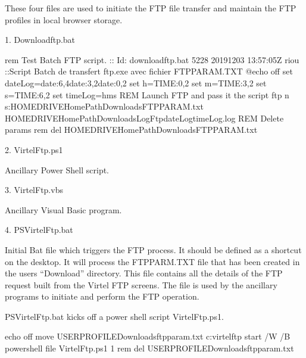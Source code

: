 \documentclass[letterpaper,10pt,english]{sphinxmanual}
\begin{document}
These four files are used to initiate the FTP file transfer and maintain the FTP profiles in local browser storage.

\begin{sphinxVerbatim}[commandchars=\\\{\}]
1.  Downloadftp.bat

    rem Test Batch FTP script.
    :: \PYGZdl{}Id: downloadftp.bat 5228 2019\PYGZhy{}12\PYGZhy{}03 13:57:05Z riou \PYGZdl{}
    ::Script Batch de transfert ftp.exe avec fichier FTPPARAM.TXT
    @echo off
    set dateLog=\PYGZpc{}date:\PYGZti{}6,4\PYGZpc{}\PYGZpc{}date:\PYGZti{}3,2\PYGZpc{}\PYGZpc{}date:\PYGZti{}0,2\PYGZpc{}
    set h=\PYGZpc{}TIME:\PYGZti{}0,2\PYGZpc{}
    set m=\PYGZpc{}TIME:\PYGZti{}3,2\PYGZpc{}
    set s=\PYGZpc{}TIME:\PYGZti{}6,2\PYGZpc{}
    set timeLog=\PYGZpc{}h\PYGZpc{}\PYGZus{}\PYGZpc{}m\PYGZpc{}\PYGZus{}\PYGZpc{}s\PYGZpc{}
    REM Launch FTP and pass it the  script
    ftp \PYGZhy{}n \PYGZhy{}s:\PYGZpc{}HOMEDRIVE\PYGZpc{}\PYGZpc{}HomePath\PYGZpc{}\PYGZbs{}Downloads\PYGZbs{}FTPPARAM.txt \PYGZgt{}\PYGZpc{}HOMEDRIVE\PYGZpc{}\PYGZpc{}HomePath\PYGZpc{}\PYGZbs{}Downloads\PYGZbs{}Log\PYGZus{}Ftp\PYGZus{}\PYGZpc{}dateLog\PYGZpc{}\PYGZus{}\PYGZpc{}timeLog\PYGZpc{}.log
    REM Delete params
    rem del \PYGZpc{}HOMEDRIVE\PYGZpc{}\PYGZpc{}HomePath\PYGZpc{}\PYGZbs{}Downloads\PYGZbs{}FTPPARAM.txt

2.  VirtelFtp.ps1

    Ancillary Power Shell script.

3.  VirtelFtp.vbs

    Ancillary Visual Basic program.

4.  PSVirtelFtp.bat

    Initial Bat file which triggers the FTP process. It should be defined as a short\PYGZhy{}cut on the desktop. It will process the FTPPARM.TXT file that has been created in the users “Download” directory. This file contains all the details of the FTP request built from the Virtel FTP screens. The file is used by the ancillary programs to initiate and perform the FTP operation.

    PSVirtelFtp.bat kicks off a power shell script VirtelFtp.ps1.

        echo off
        move \PYGZpc{}USERPROFILE\PYGZpc{}\PYGZbs{}Downloads\PYGZbs{}ftpparam.txt c:\PYGZbs{}virtel\PYGZbs{}ftp
        start /W /B powershell \PYGZhy{}file VirtelFtp.ps1 \PYGZpc{}1
        rem del \PYGZpc{}USERPROFILE\PYGZpc{}\PYGZbs{}Downloads\PYGZbs{}ftpparam.txt
\end{sphinxVerbatim}
\end{document}
